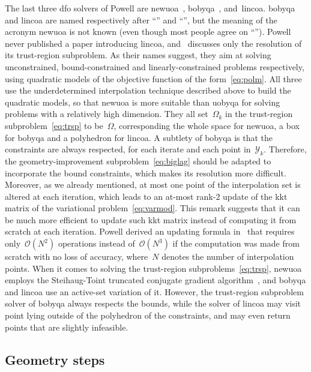 \documentclass[11pt,draft]{article}
\numberwithin{equation}{section}
\newcommand\srchspmdl[1][k]{\Omega_{#1}}
\newcommand\itpls[1][k]{\mathcal{Y}_{#1}}
\begin{document}
The last three \gls{dfo} solvers of Powell are \gls{newuoa}~\cite{Powell_2006, Powell_2008},
\gls{bobyqa}~\cite{Powell_2009}, and~\gls{lincoa}.
\Gls{bobyqa} and \gls{lincoa} are named respectively after \enquote{} and \enquote{}, but the meaning of the acronym \gls{newuoa} is not known (even though most people agree on \enquote{}).
Powell never published a paper introducing \gls{lincoa}, and~\cite{Powell_2015} discusses only the resolution of its trust-region subproblem.
As their names suggest, they aim at solving unconstrained, bound-constrained and linearly-constrained problems respectively, using quadratic models of the objective function of the form~\cref{eq:polm}.
All three use the underdetermined interpolation technique described above to build the quadratic models, so that \gls{newuoa} is more suitable than \gls{uobyqa} for solving problems with a relatively high dimension.
They all set~$\srchspmdl$ in the trust-region subproblem~\cref{eq:trsp} to be~$\Omega$, corresponding the whole space for \gls{newuoa}, a box for \gls{bobyqa} and a polyhedron for \gls{lincoa}.
A subtlety of \gls{bobyqa} is that the constraints are always respected, for each iterate and each point in~$\itpls$.
Therefore, the geometry-improvement subproblem~\cref{eq:biglag} should be adapted to incorporate the bound constraints, which makes its resolution more difficult.
Moreover, as we already mentioned, at most one point of the interpolation set is altered at each iteration, which leads to an at-most rank-$2$ update of the \gls{kkt} matrix of the variational problem~\cref{eq:varmod}.
This remark suggests that it can be much more efficient to update such \gls{kkt} matrix instead of computing it from scratch at each iteration.
Powell derived an updating formula in~\cite{Powell_2004b} that requires only~$\mathcal{O}(N^2)$ operations instead of~$\mathcal{O}(N^3)$ if the computation was made from scratch with no loss of accuracy, where~$N$ denotes the number of interpolation points.
When it comes to solving the trust-region subproblems~\cref{eq:trsp}, \gls{newuoa} employs the Steihaug-Toint truncated conjugate gradient algorithm~\cite{Steihaug_1983, Toint_1981}, and \gls{bobyqa} and \gls{lincoa} use an active-set variation of it.
However, the trust-region subproblem solver of \gls{bobyqa} always respects the bounds, while the solver of \gls{lincoa} may visit point lying outside of the polyhedron of the constraints, and may even return points that are slightly infeasible.


\subsection{Geometry steps}
\end{document}
